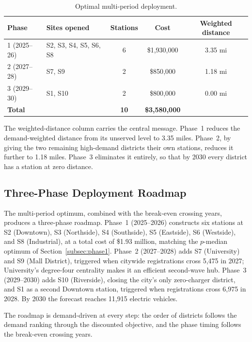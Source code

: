 \documentclass[11pt]{article}
\begin{document}
\begin{table}[H]
\centering
\caption{Optimal multi-period deployment.}
\label{tab:multiperiod}
\begin{tabular}{llccc}
\toprule
Phase & Sites opened & Stations & Cost & Weighted distance \\
\midrule
1 (2025--26) & S2, S3, S4, S5, S6, S8 & 6 & \$1{,}930{,}000 & 3.35 mi \\
2 (2027--28) & S7, S9                 & 2 & \$850{,}000     & 1.18 mi \\
3 (2029--30) & S1, S10                & 2 & \$800{,}000     & 0.00 mi \\
\midrule
\textbf{Total} & & \textbf{10} & \textbf{\$3{,}580{,}000} & \\
\bottomrule
\end{tabular}
\end{table}

The weighted-distance column carries the central message. Phase~1 reduces the demand-weighted distance from its unserved level to 3.35 miles. Phase~2, by giving the two remaining high-demand districts their own stations, reduces it further to 1.18 miles. Phase~3 eliminates it entirely, so that by 2030 every district has a station at zero distance.

\subsection{Three-Phase Deployment Roadmap}

The multi-period optimum, combined with the break-even crossing years, produces a three-phase roadmap. Phase~1 (2025--2026) constructs six stations at S2 (Downtown), S3 (Northside), S4 (Southside), S5 (Eastside), S6 (Westside), and S8 (Industrial), at a total cost of \$1.93 million, matching the $p$-median optimum of Section~\ref{subsec:phase1}. Phase~2 (2027--2028) adds S7 (University) and S9 (Mall District), triggered when citywide registrations cross 5{,}475 in 2027; University's degree-four centrality makes it an efficient second-wave hub. Phase~3 (2029--2030) adds S10 (Riverside), closing the city's only zero-charger district, and S1 as a second Downtown station, triggered when registrations cross 6{,}975 in 2028. By 2030 the forecast reaches 11{,}915 electric vehicles.

The roadmap is demand-driven at every step: the order of districts follows the demand ranking through the discounted objective, and the phase timing follows the break-even crossing years.
\end{document}
